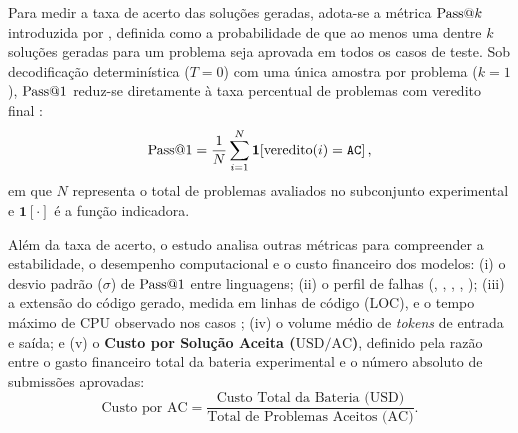Para medir a taxa de acerto das soluções geradas, adota-se a métrica $\mathrm{Pass@}k$ introduzida por \citet{chen2021evaluating}, definida como a probabilidade de que ao menos uma dentre $k$ soluções geradas para um problema seja aprovada em todos os casos de teste. Sob decodificação determinística ($T = 0$) com uma única amostra por problema ($k = 1$), $\mathrm{Pass@}1$ reduz-se diretamente à taxa percentual de problemas com veredito final :
\begin{equation}
    \mathrm{Pass@}1 = \frac{1}{N}\sum_{i=1}^{N} \mathbf{1}\!\left[\text{veredito}(i) = \texttt{AC}\right],
    \label{eq:pass1}
\end{equation}
em que $N$ representa o total de problemas avaliados no subconjunto experimental e $\mathbf{1}[\cdot]$ é a função indicadora.

Além da taxa de acerto, o estudo analisa outras métricas para compreender a estabilidade, o desempenho computacional e o custo financeiro dos modelos: (i) o desvio padrão ($\sigma$) de $\mathrm{Pass@}1$ entre linguagens; (ii) o perfil de falhas (, , , , ); (iii) a extensão do código gerado, medida em linhas de código (LOC), e o tempo máximo de CPU observado nos casos ; (iv) o volume médio de \textit{tokens} de entrada e saída; e (v) o \textbf{Custo por Solução Aceita ($\mathrm{USD}/\mathrm{AC}$)}, definido pela razão entre o gasto financeiro total da bateria experimental e o número absoluto de submissões aprovadas:
\begin{equation}
    \text{Custo por AC} = \frac{\text{Custo Total da Bateria (USD)}}{\text{Total de Problemas Aceitos (AC)}}.
    \label{eq:custo-ac}
\end{equation}
